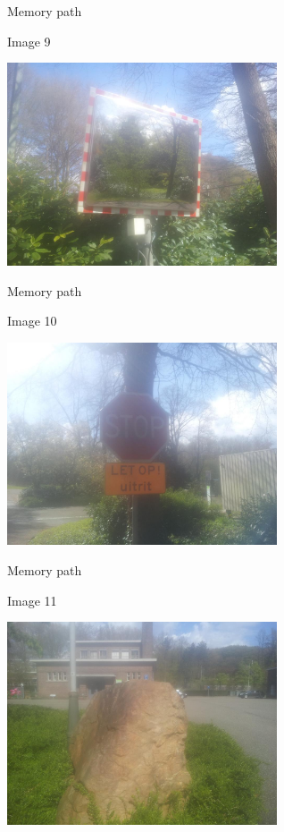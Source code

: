 \begin{frame}{Memory path}
  \begin{block}{Image 9}
    \begin{center}
      \includegraphics[height=6cm]{img/loci/09.jpg}
    \end{center}
  \end{block}
\end{frame}

\begin{frame}{Memory path}
  \begin{block}{Image 10}
    \begin{center}
      \includegraphics[height=6cm]{img/loci/10.jpg}
    \end{center}
  \end{block}
\end{frame}

\begin{frame}{Memory path}
  \begin{block}{Image 11}
    \begin{center}
      \includegraphics[height=6cm]{img/loci/11.jpg}
    \end{center}
  \end{block}
\end{frame}

